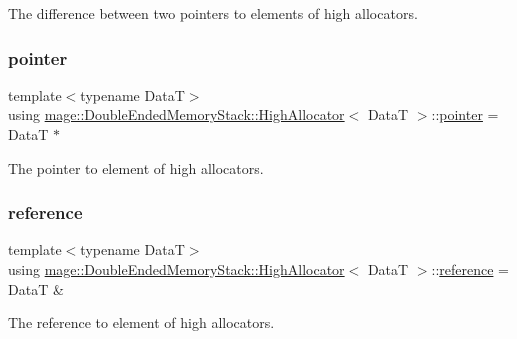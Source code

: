 The difference between two pointers to elements of high allocators. \hypertarget{structmage_1_1_double_ended_memory_stack_1_1_high_allocator_a97e4dbd7053c951de9e444d95a70809d}{}\label{structmage_1_1_double_ended_memory_stack_1_1_high_allocator_a97e4dbd7053c951de9e444d95a70809d} 
\subsubsection{\texorpdfstring{pointer}{pointer}}
{\footnotesize\ttfamily template$<$typename DataT$>$ \\
using \hyperlink{structmage_1_1_double_ended_memory_stack_1_1_high_allocator}{mage\+::\+Double\+Ended\+Memory\+Stack\+::\+High\+Allocator}$<$ DataT $>$\+::\hyperlink{structmage_1_1_double_ended_memory_stack_1_1_high_allocator_a97e4dbd7053c951de9e444d95a70809d}{pointer} =  DataT $\ast$}

The pointer to element of high allocators. \hypertarget{structmage_1_1_double_ended_memory_stack_1_1_high_allocator_ad037b00a52ebac3f03afd81bc16db9df}{}\label{structmage_1_1_double_ended_memory_stack_1_1_high_allocator_ad037b00a52ebac3f03afd81bc16db9df} 
\subsubsection{\texorpdfstring{reference}{reference}}
{\footnotesize\ttfamily template$<$typename DataT$>$ \\
using \hyperlink{structmage_1_1_double_ended_memory_stack_1_1_high_allocator}{mage\+::\+Double\+Ended\+Memory\+Stack\+::\+High\+Allocator}$<$ DataT $>$\+::\hyperlink{structmage_1_1_double_ended_memory_stack_1_1_high_allocator_ad037b00a52ebac3f03afd81bc16db9df}{reference} =  DataT \&}

The reference to element of high allocators. \hypertarget{structmage_1_1_double_ended_memory_stack_1_1_high_allocator_a0d2e29171c7898850631b1a57a29fe0d}{}\label{structmage_1_1_double_ended_memory_stack_1_1_high_allocator_a0d2e29171c7898850631b1a57a29fe0d} 
